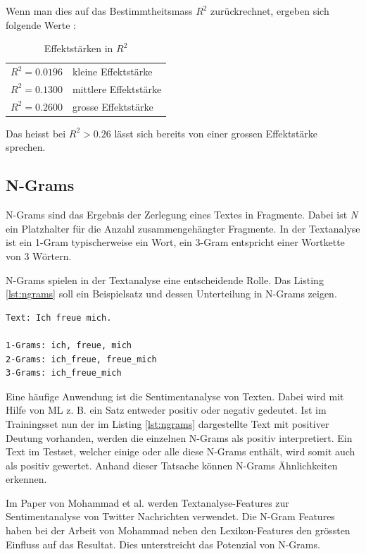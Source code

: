 \documentclass[10pt, a4paper]{article}
\begin{document}
Wenn man dies auf das Bestimmtheitsmass \(R^2\) zurückrechnet, ergeben sich folgende Werte  \cite{uzhregression}:

\begin{table}[H]
	\centering
	\begin{tabular}{l|l}
		\hline
		\(R^2 = 0.0196\) & kleine Effektstärke \\ 
		\(R^2 = 0.1300\) & mittlere Effektstärke \\ 
		\(R^2 = 0.2600\) & grosse Effektstärke \\
		\hline
	\end{tabular}
	\caption{Effektstärken in \(R^2\)}
\end{table}

Das heisst bei \(R^2 > 0.26\) lässt sich bereits von einer grossen Effektstärke sprechen.

\subsection{N-Grams}

N-Grams sind das Ergebnis der Zerlegung eines Textes in Fragmente. Dabei ist \emph{N} ein Platzhalter für die Anzahl zusammengehängter Fragmente. In der Textanalyse ist ein 1-Gram typischerweise ein Wort, ein 3-Gram entspricht einer Wortkette von 3 Wörtern.

N-Grams spielen in der Textanalyse eine entscheidende Rolle. Das Listing \ref{lst:ngrams} soll ein Beispielsatz und dessen Unterteilung in N-Grams zeigen.
\begin{lstlisting}[frame=single,caption={N-Grams Beispiel},label={lst:ngrams}]
Text: Ich freue mich.

1-Grams: ich, freue, mich
2-Grams: ich_freue, freue_mich
3-Grams: ich_freue_mich
\end{lstlisting}
Eine häufige Anwendung ist die Sentimentanalyse von Texten. Dabei wird mit Hilfe von \acs{ML} z. B. ein Satz entweder positiv oder negativ gedeutet. Ist im Trainingsset nun der im Listing \ref{lst:ngrams} dargestellte Text mit positiver Deutung vorhanden, werden die einzelnen N-Grams als positiv interpretiert. Ein Text im Testset, welcher einige oder alle diese N-Grams enthält, wird somit auch als positiv gewertet. Anhand dieser Tatsache können N-Grams Ähnlichkeiten erkennen.

Im Paper von Mohammad et al. \cite{DBLP:journals/corr/MohammadKZ13} werden Textanalyse-Features zur Sentimentanalyse von Twitter Nachrichten verwendet. Die N-Gram Features haben bei der Arbeit von Mohammad neben den Lexikon-Features den grössten Einfluss auf das Resultat. Dies unterstreicht das Potenzial von N-Grams.
\end{document}
